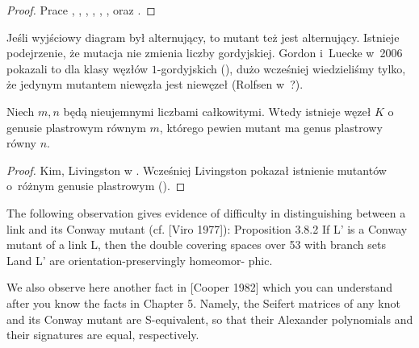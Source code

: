 \begin{proof}
    Prace \cite{menasco91}, \cite{przytycki89}, \cite{lipson87}, \cite{cooper99}, \cite{ruberman87}, \cite{ruberman99}, \cite{rong94} oraz \cite{kirk89}.
\end{proof}

Jeśli wyjściowy diagram był alternujący, to mutant też jest alternujący.
Istnieje podejrzenie, że mutacja nie zmienia liczby gordyjskiej.
Gordon i~Luecke w~2006 pokazali to dla klasy węzłów $1$-gordyjskich (\cite{gordon06}), dużo wcześniej wiedzieliśmy tylko, że jedynym mutantem niewęzła jest niewęzeł (Rolfsen w~\cite{rolfsen93}?).

\begin{proposition}
    Niech $m, n$ będą nieujemnymi liczbami całkowitymi.
    Wtedy istnieje węzeł $K$ o genusie plastrowym równym $m$, którego pewien mutant ma genus plastrowy równy $n$.
\end{proposition}

\begin{proof}
    Kim, Livingston w \cite{kim05}.
    Wcześniej Livingston pokazał istnienie mutantów o~różnym genusie plastrowym (\cite{livingston83}).
\end{proof}

\begin{tobedone}
The following observation gives evidence of difficulty in distinguishing between a link and its Conway mutant (cf. [Viro 1977]):
Proposition 3.8.2 If L' is a Conway mutant of a link L, then the double covering spaces over 53 with branch sets Land L' are orientation-preservingly homeomor- phic.

We also observe here another fact in [Cooper 1982] which you can understand after you know the facts in Chapter 5. Namely, the Seifert matrices of any knot and its Conway mutant are S-equivalent, so that their Alexander polynomials and their signatures are equal, respectively.
\end{tobedone}
